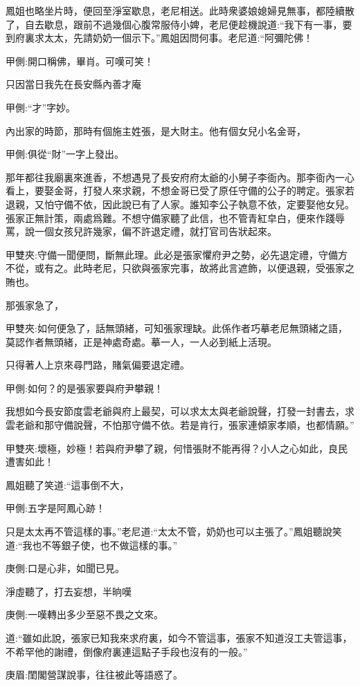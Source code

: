 \begin{parag}
    鳳姐也略坐片時，便回至淨室歇息，老尼相送。此時衆婆娘媳婦見無事，都陸續散了，自去歇息，跟前不過幾個心腹常服侍小婢，老尼便趁機說道:“我下有一事，要到府裏求太太，先請奶奶一個示下。”鳳姐因問何事。老尼道:“阿彌陀佛！\begin{note}甲側:開口稱佛，畢肖。可嘆可笑！\end{note}只因當日我先在長安縣內善才庵\begin{note}甲側:“才”字妙。\end{note}內出家的時節，那時有個施主姓張，是大財主。他有個女兒小名金哥，\begin{note}甲側:俱從“財”一字上發出。\end{note}那年都往我廟裏來進香，不想遇見了長安府府太爺的小舅子李衙內。那李衙內一心看上，要娶金哥，打發人來求親，不想金哥已受了原任守備的公子的聘定。張家若退親，又怕守備不依，因此說已有了人家。誰知李公子執意不依，定要娶他女兒。張家正無計策，兩處爲難。不想守備家聽了此信，也不管青紅皁白，便來作踐辱罵，說一個女孩兒許幾家，偏不許退定禮，就打官司告狀起來。\begin{note}甲雙夾:守備一聞便問，斷無此理。此必是張家懼府尹之勢，必先退定禮，守備方不從，或有之。此時老尼，只欲與張家完事，故將此言遮飾，以便退親，受張家之賄也。\end{note}那張家急了，\begin{note}甲雙夾:如何便急了，話無頭緒，可知張家理缺。此係作者巧摹老尼無頭緒之語，莫認作者無頭緒，正是神處奇處。摹一人，一人必到紙上活現。\end{note}只得著人上京來尋門路，賭氣偏要退定禮。\begin{note}甲側:如何？的是張家要與府尹攀親！\end{note}我想如今長安節度雲老爺與府上最契，可以求太太與老爺說聲，打發一封書去，求雲老爺和那守備說聲，不怕那守備不依。若是肯行，張家連傾家孝順，也都情願。”\begin{note}甲雙夾:壞極，妙極！若與府尹攀了親，何惜張財不能再得？小人之心如此，良民遭害如此！\end{note}
\end{parag}


\begin{parag}
    鳳姐聽了笑道:“這事倒不大，\begin{note}甲側:五字是阿鳳心跡！\end{note}只是太太再不管這樣的事。”老尼道:“太太不管，奶奶也可以主張了。”鳳姐聽說笑道:“我也不等銀子使，也不做這樣的事。”\begin{note}庚側:口是心非，如聞已見。\end{note}淨虛聽了，打去妄想，半晌嘆\begin{note}庚側:一嘆轉出多少至惡不畏之文來。\end{note}道:“雖如此說，張家已知我來求府裏，如今不管這事，張家不知道沒工夫管這事，不希罕他的謝禮，倒像府裏連這點子手段也沒有的一般。”\begin{note}庚眉:閨閣營謀說事，往往被此等語惑了。\end{note}
\end{parag}


